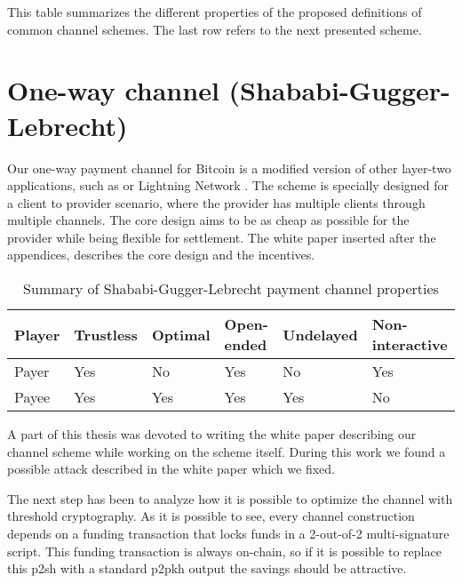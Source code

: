 This table summarizes the different properties of the proposed definitions of
common channel schemes. The last row refers to the next presented scheme.

\section{One-way channel (Shababi-Gugger-Lebrecht)}

Our one-way payment channel for Bitcoin is a modified version of other layer-two
applications, such as  or Lightning Network
\cite{poon2016bitcoin, YoursLightningProtocol}. The scheme is specially designed
for a client to provider scenario, where the provider has multiple clients
through multiple channels. The core design aims to be as cheap as possible for
the provider while being flexible for settlement. The white paper  inserted
after the appendices, describes the core design and the incentives.

\begin{table}[h]
  \begin{tabularx}{\textwidth}{ | X | l | l | l | l | l |}
  \hline
  Player & Trustless & Optimal & Open-ended & Undelayed & Non-interactive \\ \hline \hline
  Payer & Yes & No & Yes & No & Yes \\ \hline
  Payee & Yes & Yes & Yes & Yes & No \\
  \hline
  \end{tabularx}
  \caption{Summary of Shababi-Gugger-Lebrecht payment channel properties}
  \label{fig:summaryShababiGuggerLebrechtPaymentChannel}
\end{table}

A part of this thesis was devoted to writing the white paper describing our
channel scheme while working on the scheme itself. During this work we found a
possible attack described in the white paper which we fixed.

The next step has been to analyze how it is possible to optimize the channel
with threshold cryptography. As it is possible to see, every channel
construction depends on a funding transaction that locks funds in a 2-out-of-2
multi-signature script. This funding transaction is always on-chain, so if it is
possible to replace this \gls{p2sh} with a standard \gls{p2pkh} output the savings
should be attractive.


